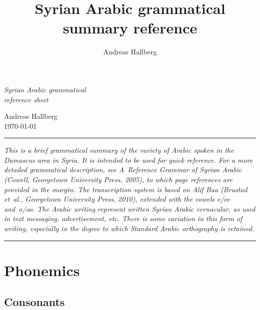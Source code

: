 \documentclass[oneside,a4paper]{article}
\title{Syrian Arabic grammatical\\summary reference}
\author{Andreas Hallberg}
\newcommand{\trans}[1]{\textit{\hyphenpenalty=10000#1}}
\begin{document}
{\Huge\itshape Syrian Arabic grammatical\\[\medskipamount]reference sheet}

\bigskip

Andreas Hallberg\\
\today

\bigskip


\hrule
\setlength{\columnsep}{1em}
\begin{multicols}{3}
  \setlength\parfillskip{0pt}
\itshape
This is a brief grammatical summary of the variety of Arabic spoken in the Damascus area in Syria. It is intended to be used for quick reference. For a more detailed grammatical description, see \textit{A~Reference Grammar of Syrian Arabic} (Cowell, Georgetown University Press, 2005), to which page references are provided in the margin. The transcription system is based on \textit{Alif Baa} (Brustad et~al., Georgetown University Press, 2010), extended with the vowels \trans{e/ee} and~\trans{o/oo}. The Arabic writing represent written Syrian Arabic vernacular, as used in text messaging, advertisement, etc. There is some variation in this form of writing, especially in the degree to which Standard Arabic orthography is retained.
\end{multicols}

\bigskip
\hrule

\setlength{\columnsep}{30pt}

\section{Phonemics}

\subsection{Consonants}
\end{document}
